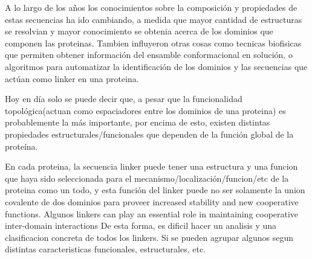 % 


A lo largo de los años los conocimientos sobre la composición y propiedades de estas secuencias ha ido cambiando, 
a medida que mayor cantidad de estructuras se resolvian y mayor conocimiento se obtenia acerca de los dominios que componen 
las proteinas. Tambien influyeron otras cosas como tecnicas biofisicas que permiten obtener información del ensamble conformacional en solución,
o algoritmos para automatizar la identificación de los dominios y las secuencias que actúan como linker en una proteina.



Hoy en día solo se puede decir que, a pesar que la funcionalidad topológica(actuan como espaciadores entre los dominios de una proteina) es probablemente la más importante,
por encima de esto, existen distintas propiedades estructurales/funcionales que dependen de la función global de la proteína.

En cada proteina, la secuencia linker puede tener una estructura y una funcion que haya sido seleccionada para el mecanismo/localización/funcion/etc de la proteina como un todo, 
y esta función del linker puede no ser solamente la union covalente de dos dominios para proveer increased stability and new cooperative functions.
Algunos linkers can play an essential role in maintaining cooperative inter-domain interactions
De esta forma, es dificil hacer un analisis y una clasificacion concreta de todos los linkers. Si se pueden agrupar algunos segun distintas caracteristicas funcionales, estructurales, etc.






